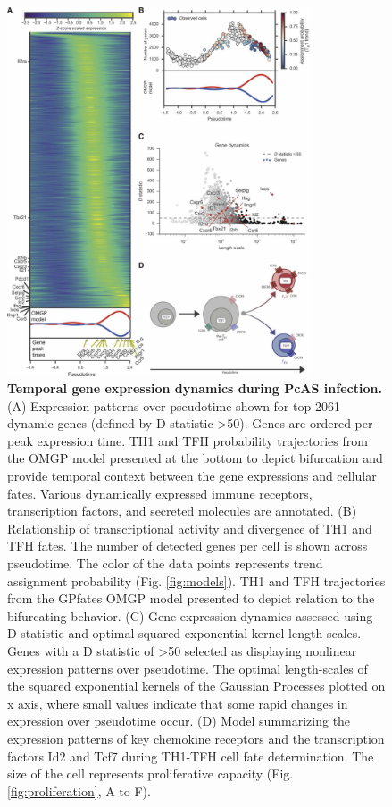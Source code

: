 \begin{figure}
    \centering
    \includegraphics[width=0.8\textwidth]{"Fig5"}
    \caption[Temporal gene expression dynamics during PcAS infection]{\textbf{Temporal gene expression dynamics during PcAS infection.} (A) Expression patterns over pseudotime shown for top 2061 dynamic genes (defined by D statistic >50). Genes are ordered per peak expression time. TH1 and TFH probability trajectories from the  OMGP model presented at the bottom to depict bifurcation and provide temporal context between the gene expressions and cellular fates. Various dynamically expressed immune receptors, transcription factors, and secreted molecules are annotated. (B) Relationship of transcriptional activity and divergence of TH1 and TFH fates. The number of detected genes per cell is shown across pseudotime. The color of the data points represents trend assignment probability (Fig. \ref{fig:models}). TH1 and TFH trajectories from the GPfates OMGP model presented to depict relation to the bifurcating behavior. (C) Gene expression dynamics assessed using D statistic and optimal squared exponential kernel length-scales. Genes with a D statistic of >50 selected as displaying nonlinear expression patterns over pseudotime. The optimal length-scales of the squared exponential kernels of the Gaussian Processes plotted on x axis, where small values indicate that some rapid changes in expression over pseudotime occur. (D) Model summarizing the expression patterns of key chemokine receptors and the transcription factors Id2 and Tcf7 during TH1-TFH cell fate determination. The size of the cell represents proliferative capacity (Fig. \ref{fig:proliferation}, A to F).}
    \label{fig:temporal}
\end{figure}


